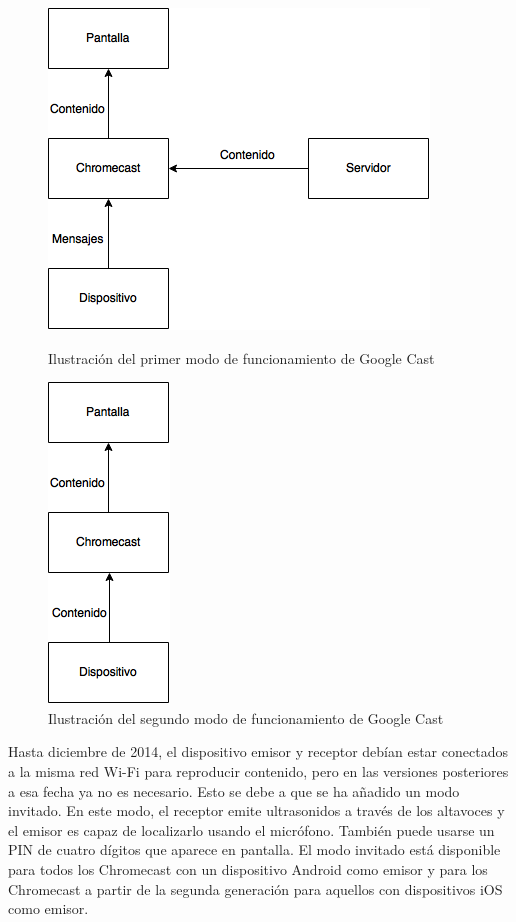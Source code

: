 \begin{figure}[h]
	\centering
	\begin{minipage}[b]{.35\textwidth}
		\centering
		\includegraphics[scale=0.65]{./Imagenes/ChromecastModo1.png}
		\caption{Ilustración del primer modo de funcionamiento de Google Cast}\label{fig:modo1}
	\end{minipage}\qquad
	\hspace{1cm}
	\begin{minipage}[b]{.35\textwidth}
		\centering
		\includegraphics[scale=0.65]{./Imagenes/ChromecastModo2.png}
		\caption{Ilustración del segundo modo de funcionamiento de Google Cast}\label{fig:modo2}
	\end{minipage}
\end{figure}

Hasta diciembre de 2014, el dispositivo emisor y receptor debían estar conectados a la misma red Wi-Fi para reproducir contenido, pero en las versiones posteriores a esa fecha ya no es necesario.
Esto se debe a que se ha añadido un modo invitado.
En este modo, el receptor emite ultrasonidos a través de los altavoces y el emisor es capaz de localizarlo usando el micrófono.
También puede usarse un PIN de cuatro dígitos que aparece en pantalla.
El modo invitado está disponible para todos los Chromecast con un dispositivo Android como emisor y para los Chromecast a partir de la segunda generación para aquellos con dispositivos iOS como emisor.

